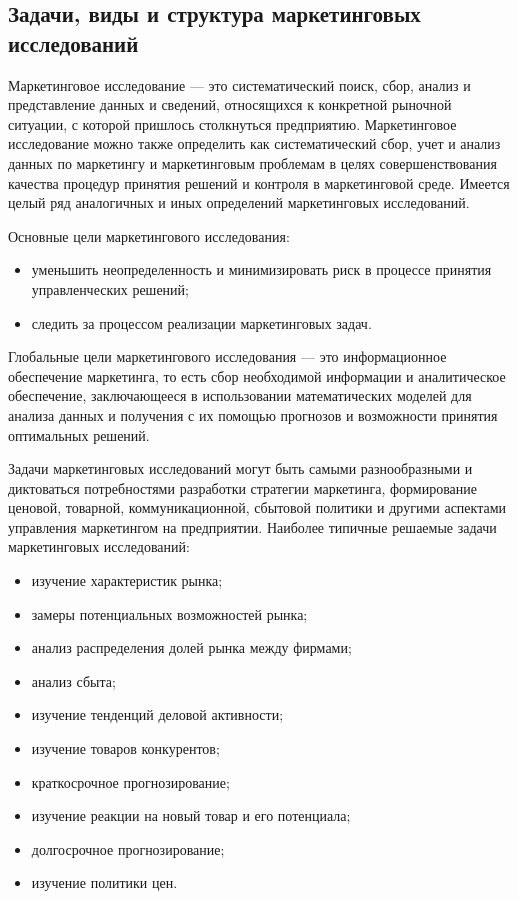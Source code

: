 \documentclass[a4paper,12pt,oneside,final]{extarticle}
\numberwithin{equation}{section}
\begin{document}
\subsection{Задачи, виды и структура маркетинговых исследований}
Маркетинговое исследование --- это систематический поиск, сбор, анализ и представление данных и сведений, относящихся к конкретной рыночной ситуации, с которой пришлось столкнуться предприятию. 
Маркетинговое исследование можно также определить как систематический сбор, учет и анализ данных по маркетингу и маркетинговым проблемам в целях совершенствования качества процедур принятия решений и контроля в маркетинговой среде. 
Имеется целый ряд аналогичных и иных определений маркетинговых исследований.

Основные цели маркетингового исследования:
\begin{itemize}
	\item уменьшить неопределенность и минимизировать риск в процессе принятия управленческих решений;
	\item следить за процессом реализации маркетинговых задач.
\end{itemize}

Глобальные цели маркетингового исследования --- это информационное обеспечение маркетинга, то есть сбор необходимой информации и аналитическое обеспечение, заключающееся в использовании математических моделей для анализа данных и получения с их помощью прогнозов и возможности принятия оптимальных решений.

Задачи маркетинговых исследований могут быть самыми разнообразными и диктоваться потребностями разработки стратегии маркетинга, формирование ценовой, товарной, коммуникационной, сбытовой политики и другими аспектами управления маркетингом на предприятии. 
Наиболее типичные решаемые задачи маркетинговых исследований:
\begin{itemize}
	\item изучение характеристик рынка;
	\item замеры потенциальных возможностей рынка;
	\item анализ распределения долей рынка между фирмами;
	\item анализ сбыта;
	\item изучение тенденций деловой активности;
	\item изучение товаров конкурентов;
	\item краткосрочное прогнозирование;
	\item изучение реакции на новый товар и его потенциала;
	\item долгосрочное прогнозирование;
	\item изучение политики цен.
\end{itemize}
\end{document}
